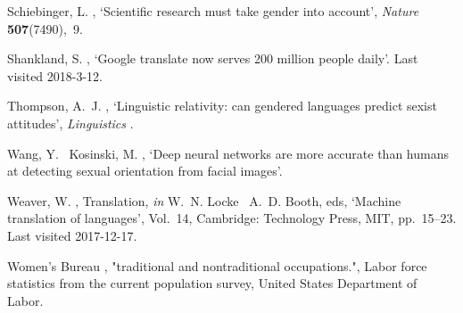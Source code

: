 \documentclass[fleqn,10pt]{article}
\begin{document}
\begin{thebibliography}{xx}
Schiebinger, L.  \harvardyearright , `Scientific research
  must take gender into account', {\em Nature} {\bf 507}(7490),~9.

Shankland, S.  \harvardyearright , `Google translate now
  serves 200 million people daily'.
\newblock Last visited 2018-3-12.
\newline{}

Thompson, A.~J.  \harvardyearright , `Linguistic
  relativity: can gendered languages predict sexist attitudes', {\em
  Linguistics} .

Wang, Y. \harvardand\ Kosinski, M.  \harvardyearright ,
  `Deep neural networks are more accurate than humans at detecting sexual
  orientation from facial images'.

Weaver, W.  \harvardyearright , Translation, {\em in}
  W.~N. Locke \harvardand\ A.~D. Booth, eds, `Machine translation of
  languages', Vol.~14, Cambridge: Technology Press, MIT, pp.~15--23.
\newblock Last visited 2017-12-17.
\newline{}

{Women’s Bureau}  \harvardyearright , "traditional and
  nontraditional occupations.", Labor force statistics from the current
  population survey, United States Department of Labor.

\end{thebibliography}
\end{document}
